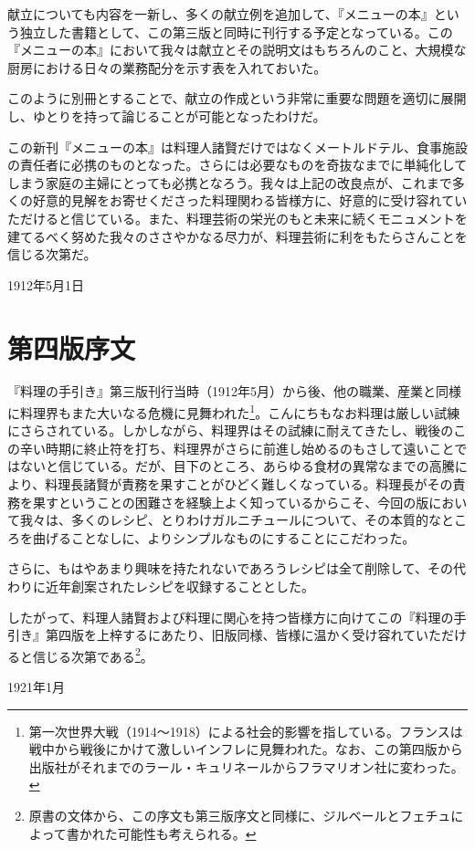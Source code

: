 \begin{main}
献立についても内容を一新し、多くの献立例を追加して、『メニューの本』という独立した書籍として、この第三版と同時に刊行する予定となっている。この『メニューの本』において我々は献立とその説明文はもちろんのこと、大規模な厨房における日々の業務配分を示す表を入れておいた。

このように別冊とすることで、献立の作成という非常に重要な問題を適切に展開し、ゆとりを持って論じることが可能となったわけだ。

この新刊『メニューの本』は料理人諸賢だけではなくメートルドテル、食事施設の責任者に必携のものとなった。さらには必要なものを奇抜なまでに単純化してしまう家庭の主婦にとっても必携となろう。我々は上記の改良点が、これまで多くの好意的見解をお寄せくださった料理関わる皆様方に、好意的に受け容れていただけると信じている。また、料理芸術の栄光のもと未来に続くモニュメントを建てるべく努めた我々のささやかなる尽力が、料理芸術に利をもたらさんことを信じる次第だ。

\begin{flushright}
1912年5月1日
\end{flushright}

\end{main}

\hypertarget{introduction-quatrieme-edition}{%
\section{第四版序文}\label{introduction-quatrieme-edition}}

\begin{main}

\vspace*{1\zw}

『料理の手引き』第三版刊行当時（1912年5月）から後、他の職業、産業と同様に料理界もまた大いなる危機に見舞われた\footnote{第一次世界大戦（1914〜1918）による社会的影響を指している。フランスは戦中から戦後にかけて激しいインフレに見舞われた。なお、この第四版から出版社がそれまでのラール・キュリネールからフラマリオン社に変わった。}。こんにちもなお料理は厳しい試練にさらされている。しかしながら、料理界はその試練に耐えてきたし、戦後のこの辛い時期に終止符を打ち、料理界がさらに前進し始めるのもさして遠いことではないと信じている。だが、目下のところ、あらゆる食材の異常なまでの高騰により、料理長諸賢が責務を果すことがひどく難しくなっている。料理長がその責務を果すということの困難さを経験上よく知っているからこそ、今回の版において我々は、多くのレシピ、とりわけガルニチュールについて、その本質的なところを曲げることなしに、よりシンプルなものにすることにこだわった。

さらに、もはやあまり興味を持たれないであろうレシピは全て削除して、その代わりに近年創案されたレシピを収録することとした。

したがって、料理人諸賢および料理に関心を持つ皆様方に向けてこの『料理の手引き』第四版を上梓するにあたり、旧版同様、皆様に温かく受け容れていただけると信じる次第である\footnote{原書の文体から、この序文も第三版序文と同様に、ジルベールとフェチュによって書かれた可能性も考えられる。}。

\begin{flushright}
1921年1月
\end{flushright}

\end{main}

